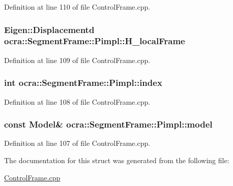 Definition at line 110 of file Control\+Frame.\+cpp.

\subsubsection[{\texorpdfstring{H\+\_\+local\+Frame}{H_localFrame}}]{\setlength{\rightskip}{0pt plus 5cm}Eigen\+::\+Displacementd ocra\+::\+Segment\+Frame\+::\+Pimpl\+::\+H\+\_\+local\+Frame}\hypertarget{structocra_1_1SegmentFrame_1_1Pimpl_a5e0d767dc540fbd56b1e6f125ba7abf6}{}\label{structocra_1_1SegmentFrame_1_1Pimpl_a5e0d767dc540fbd56b1e6f125ba7abf6}


Definition at line 109 of file Control\+Frame.\+cpp.

\subsubsection[{\texorpdfstring{index}{index}}]{\setlength{\rightskip}{0pt plus 5cm}int ocra\+::\+Segment\+Frame\+::\+Pimpl\+::index}\hypertarget{structocra_1_1SegmentFrame_1_1Pimpl_aeeadbd2b42d3e0cf750cbc0df50f213c}{}\label{structocra_1_1SegmentFrame_1_1Pimpl_aeeadbd2b42d3e0cf750cbc0df50f213c}


Definition at line 108 of file Control\+Frame.\+cpp.

\subsubsection[{\texorpdfstring{model}{model}}]{\setlength{\rightskip}{0pt plus 5cm}const {\bf Model}\& ocra\+::\+Segment\+Frame\+::\+Pimpl\+::model}\hypertarget{structocra_1_1SegmentFrame_1_1Pimpl_a787a1cc368ab12229ecd11358e2805e1}{}\label{structocra_1_1SegmentFrame_1_1Pimpl_a787a1cc368ab12229ecd11358e2805e1}


Definition at line 107 of file Control\+Frame.\+cpp.



The documentation for this struct was generated from the following file\+:\begin{DoxyCompactItemize}
\item 
\hyperlink{ControlFrame_8cpp}{Control\+Frame.\+cpp}\end{DoxyCompactItemize}
